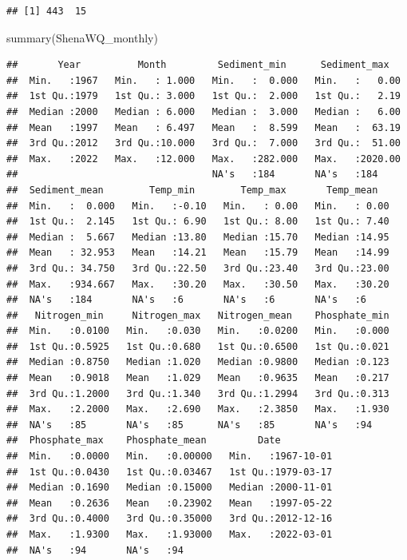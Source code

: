 \documentclass[
  12pt,
]{article}
\newenvironment{Shaded}{\begin{snugshade}}{\end{snugshade}}
\newcommand{\FunctionTok}[1]{\textcolor[rgb]{0.00,0.00,0.00}{#1}}
\newcommand{\NormalTok}[1]{#1}
\begin{document}
\begin{verbatim}
## [1] 443  15
\end{verbatim}

\begin{Shaded}
\begin{Highlighting}[]
\FunctionTok{summary}\NormalTok{(ShenaWQ\_monthly)}
\end{Highlighting}
\end{Shaded}

\begin{verbatim}
##       Year          Month         Sediment_min      Sediment_max    
##  Min.   :1967   Min.   : 1.000   Min.   :  0.000   Min.   :   0.00  
##  1st Qu.:1979   1st Qu.: 3.000   1st Qu.:  2.000   1st Qu.:   2.19  
##  Median :2000   Median : 6.000   Median :  3.000   Median :   6.00  
##  Mean   :1997   Mean   : 6.497   Mean   :  8.599   Mean   :  63.19  
##  3rd Qu.:2012   3rd Qu.:10.000   3rd Qu.:  7.000   3rd Qu.:  51.00  
##  Max.   :2022   Max.   :12.000   Max.   :282.000   Max.   :2020.00  
##                                  NA's   :184       NA's   :184      
##  Sediment_mean        Temp_min        Temp_max       Temp_mean    
##  Min.   :  0.000   Min.   :-0.10   Min.   : 0.00   Min.   : 0.00  
##  1st Qu.:  2.145   1st Qu.: 6.90   1st Qu.: 8.00   1st Qu.: 7.40  
##  Median :  5.667   Median :13.80   Median :15.70   Median :14.95  
##  Mean   : 32.953   Mean   :14.21   Mean   :15.79   Mean   :14.99  
##  3rd Qu.: 34.750   3rd Qu.:22.50   3rd Qu.:23.40   3rd Qu.:23.00  
##  Max.   :934.667   Max.   :30.20   Max.   :30.50   Max.   :30.20  
##  NA's   :184       NA's   :6       NA's   :6       NA's   :6      
##   Nitrogen_min     Nitrogen_max   Nitrogen_mean    Phosphate_min  
##  Min.   :0.0100   Min.   :0.030   Min.   :0.0200   Min.   :0.000  
##  1st Qu.:0.5925   1st Qu.:0.680   1st Qu.:0.6500   1st Qu.:0.021  
##  Median :0.8750   Median :1.020   Median :0.9800   Median :0.123  
##  Mean   :0.9018   Mean   :1.029   Mean   :0.9635   Mean   :0.217  
##  3rd Qu.:1.2000   3rd Qu.:1.340   3rd Qu.:1.2994   3rd Qu.:0.313  
##  Max.   :2.2000   Max.   :2.690   Max.   :2.3850   Max.   :1.930  
##  NA's   :85       NA's   :85      NA's   :85       NA's   :94     
##  Phosphate_max    Phosphate_mean         Date           
##  Min.   :0.0000   Min.   :0.00000   Min.   :1967-10-01  
##  1st Qu.:0.0430   1st Qu.:0.03467   1st Qu.:1979-03-17  
##  Median :0.1690   Median :0.15000   Median :2000-11-01  
##  Mean   :0.2636   Mean   :0.23902   Mean   :1997-05-22  
##  3rd Qu.:0.4000   3rd Qu.:0.35000   3rd Qu.:2012-12-16  
##  Max.   :1.9300   Max.   :1.93000   Max.   :2022-03-01  
##  NA's   :94       NA's   :94
\end{verbatim}
\end{document}
